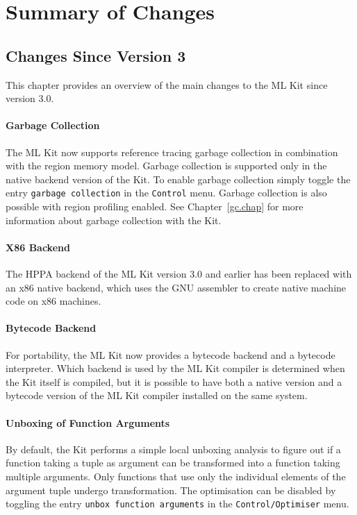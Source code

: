 \documentclass[12pt]{book}
\begin{document}
\chapter{Summary of Changes}

\section{Changes Since Version 3}
%
This chapter provides an overview of the main changes to the ML Kit
since version 3.0.

\subsubsection*{Garbage Collection}
%
The ML Kit now supports reference tracing garbage collection in
combination with the region memory model. Garbage collection is
supported only in the native backend version of the Kit. To enable
garbage collection simply toggle the entry {\tt garbage collection} in
the {\tt Control} menu. Garbage collection is also possible with
region profiling enabled. See Chapter~\ref{gc.chap} for more
information about garbage collection with the Kit.

\subsubsection*{X86 Backend}
The 
%
HPPA backend of the ML Kit version 3.0 and earlier has been replaced
with an
%
x86 native backend, which uses the GNU assembler to create native
machine code on x86 machines.

\subsubsection*{Bytecode Backend}
%
For portability, the ML Kit now provides a bytecode backend and a
bytecode interpreter. Which backend is used by the ML Kit compiler is
determined when the Kit itself is compiled, but it is possible to have
both a native version and a bytecode version of the ML Kit compiler
installed on the same system.

\subsubsection*{Unboxing of Function Arguments}
%
By default, the Kit performs a simple local unboxing analysis to
figure out if a function taking a tuple as argument can be transformed
into a function taking multiple arguments. Only functions that use
only the individual elements of the argument tuple undergo
transformation. The optimisation can be disabled by toggling the entry
{\tt unbox function arguments} in the {\tt Control/Optimiser} menu.
\end{document}
